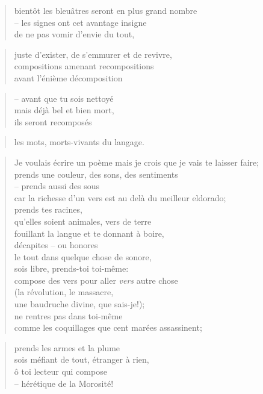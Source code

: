   \begin{verse}
    bientôt les bleuâtres seront en plus grand nombre\\
    -- les signes ont cet avantage insigne\\
    de ne pas vomir d’envie du tout,
  \end{verse}
  \begin{verse}
    juste d’exister, de s’emmurer et de revivre,\\
    compositions amenant recompositions\\
    avant l’énième décomposition
  \end{verse}
  \begin{verse}
    -- avant que tu sois nettoyé\\
    mais déjà bel et bien mort,\\
    ils seront recomposés
  \end{verse}
  \begin{verse}
    les mots, morts-vivants du langage.
  \end{verse}
  \begin{verse}
    Je voulais écrire un poème mais je crois que je vais te laisser faire;\\
    prends une couleur, des sons, des sentiments\\
    -- prends aussi des sous\\
    car la richesse d’un vers est au delà du meilleur eldorado;\\
    prends tes racines,\\
    qu’elles soient animales, vers de terre\\
    fouillant la langue et te donnant à boire,\\
    décapites -- ou honores\\
    le tout dans quelque chose de sonore,\\
    sois libre, prends-toi toi-même:\\
    compose des vers pour aller \emph{vers} autre chose\\
    (la révolution, le massacre,\\
    une baudruche divine, que sais-je!);\\
    ne rentres pas dans toi-même\\
    comme les coquillages que cent marées assassinent;
  \end{verse}
  \begin{verse}
    prends les armes et la plume\\
    sois méfiant de tout, étranger à rien,\\
    ô toi lecteur qui compose\\
    -- hérétique de la Morosité!
  \end{verse}
